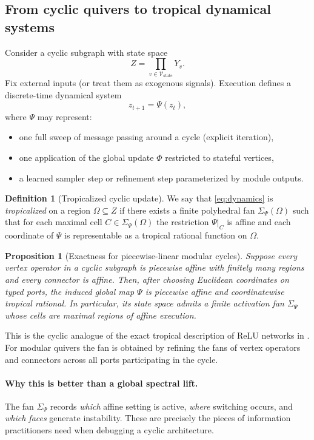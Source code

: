 \documentclass[11pt]{article}
\theoremstyle{definition}
\newtheorem{definition}{Definition}[section]
\theoremstyle{plain}
\newtheorem{proposition}{Proposition}[section]
\theoremstyle{remark}
\newcommand{\mc}[1]{\mathcal{#1}}
\newcommand{\Nodes}{\mc{V}}
\begin{document}
\subsection{From cyclic quivers to tropical dynamical systems}
Consider a cyclic subgraph with state space
\[
Z=\prod_{v\in\Nodes_\mathrm{state}} Y_v.
\]
Fix external inputs (or treat them as exogenous signals).
Execution defines a discrete-time dynamical system
\begin{equation}
z_{t+1} = \Psi(z_t),
\label{eq:dynamics}
\end{equation}
where $\Psi$ may represent:
\begin{itemize}[leftmargin=2em]
\item one full sweep of message passing around a cycle (explicit iteration),
\item one application of the global update $\Phi$ restricted to stateful vertices,
\item a learned sampler step or refinement step parameterized by module outputs.
\end{itemize}

\begin{definition}[Tropicalized cyclic update]
We say that \eqref{eq:dynamics} is \emph{tropicalized} on a region $\Omega\subseteq Z$ if there exists a finite polyhedral fan $\Sigma_\Psi(\Omega)$ such that for each maximal cell $C\in\Sigma_\Psi(\Omega)$ the restriction $\Psi|_C$ is affine and each coordinate of $\Psi$ is representable as a tropical rational function on $\Omega$.
\end{definition}

\begin{proposition}[Exactness for piecewise-linear modular cycles]
Suppose every vertex operator in a cyclic subgraph is piecewise affine with finitely many regions and every connector is affine.
Then, after choosing Euclidean coordinates on typed ports, the induced global map $\Psi$ is piecewise affine and coordinatewise tropical rational.
In particular, its state space admits a finite activation fan $\Sigma_\Psi$ whose cells are maximal regions of affine execution.
\end{proposition}

This is the cyclic analogue of the exact tropical description of ReLU networks in \cite{ZhangNaitzatLim2018}.
For modular quivers the fan is obtained by refining the fans of vertex operators and connectors across all ports participating in the cycle.

\paragraph{Why this is better than a global spectral lift.}
The fan $\Sigma_\Psi$ records \emph{which} affine setting is active, \emph{where} switching occurs, and \emph{which faces} generate instability.
These are precisely the pieces of information practitioners need when debugging a cyclic architecture.
\end{document}

